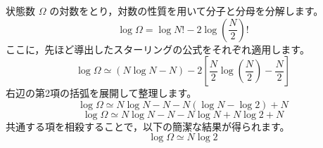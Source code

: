 \begin{solutionparts}
状態数 $\Omega$ の対数をとり，対数の性質を用いて分子と分母を分解します。
\begin{equation*}
\log \Omega = \log N! - 2 \log \left(\frac{N}{2}\right)!
\end{equation*}
ここに，先ほど導出したスターリングの公式をそれぞれ適用します。
\begin{equation*}
\log \Omega \simeq (N \log N - N) - 2 \left[ \frac{N}{2} \log \left(\frac{N}{2}\right) - \frac{N}{2} \right]
\end{equation*}
右辺の第2項の括弧を展開して整理します。
\begin{equation*}
\log \Omega \simeq N \log N - N - N \left( \log N - \log 2 \right) + N
\end{equation*}
\begin{equation*}
\log \Omega \simeq N \log N - N - N \log N + N \log 2 + N
\end{equation*}
共通する項を相殺することで，以下の簡潔な結果が得られます。
\begin{equation*}
\log \Omega \simeq N \log 2
\end{equation*}

\end{solutionparts}

